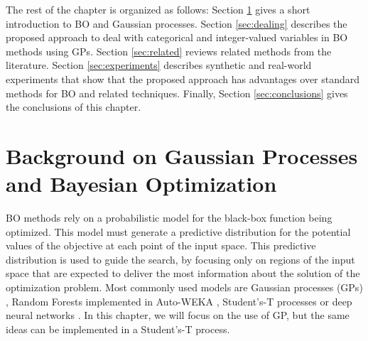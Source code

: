 The rest of the chapter is organized as follows: Section \ref{sec:back} gives a 
short introduction to BO and Gaussian processes. 
Section \ref{sec:dealing} describes the proposed approach 
to deal with categorical and integer-valued variables in BO methods using GPs. Section \ref{sec:related} reviews
related methods from the literature. Section \ref{sec:experiments} describes synthetic and real-world 
experiments that show that the proposed approach has advantages over standard methods for BO and related
techniques. Finally, Section \ref{sec:conclusions} gives the conclusions of this chapter.

\section{Background on Gaussian Processes and Bayesian Optimization} 
\label{sec:back}

BO methods rely on a probabilistic model for the black-box function being optimized. This 
model must generate a predictive distribution for the potential values of the objective at 
each point of the input space. This predictive distribution is used to guide the search, 
by focusing only on regions of the input space that are expected to deliver the most
information about the solution of the optimization problem. Most commonly used models are Gaussian processes (GPs) 
\citep{rasmussen2003gaussian}, Random Forests implemented in Auto-WEKA \citep{thornton2013auto}, 
Student's-T processes \citep{shah2014student} or deep neural networks 
\citep{snoek2015scalable}. In this chapter, we will focus on the use of GP, but the same ideas can be 
implemented in a Student's-T process.


